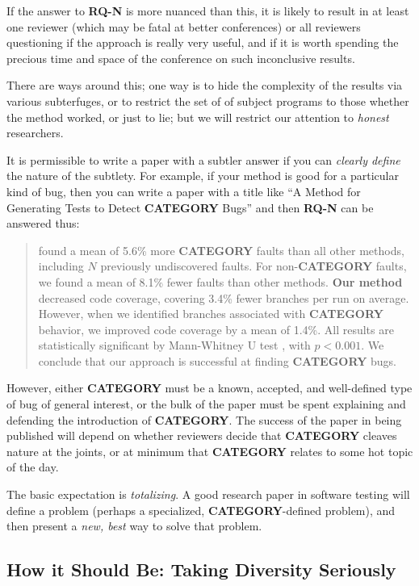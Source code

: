 \documentclass[sigplan,screen]{acmart}
\begin{document}
If the answer to {\bf RQ-N} is more nuanced than this, it is likely to result in
at least one reviewer (which may be fatal at better conferences) or
all reviewers questioning if the approach is really very useful, and
if it is worth spending the precious time and space of the conference
on such inconclusive results.

There are ways around this; one way is to hide the complexity of the
results via various subterfuges, or to restrict the set of of subject
programs to those whether the method worked, or just to lie; but we
will restrict our attention to \emph{honest} researchers.

It is permissible to write a paper with a subtler answer if you can
\emph{clearly define} the nature of the subtlety.  For example, if
your method is good for a particular kind of bug, then you can write a
paper with a title like ``A Method for Generating Tests to Detect {\bf
  CATEGORY} Bugs'' and then {\bf RQ-N} can be answered thus:


\begin{quote}
 found a mean of 5.6\% more {\bf CATEGORY} faults than all
other methods, including $N$ previously undiscovered faults.  For
non-{\bf CATEGORY} faults, we found a mean of 8.1\% fewer faults than
other methods. {\bf Our
  method} decreased code coverage, covering 3.4\% fewer branches
per run on average.  However, when we identified branches associated
with {\bf CATEGORY} behavior, we improved code coverage by a mean of
1.4\%.  All results are statistically significant by
Mann-Whitney U test \cite{arcuri2014hitchhiker}, with $p < 0.001$.  We
conclude that our approach is successful at finding {\bf CATEGORY} bugs.
\end{quote}

However, either {\bf CATEGORY} must be a known, accepted, and
well-defined type of bug of general interest, or the bulk of the paper
must be spent explaining and defending the introduction of {\bf
  CATEGORY}.  The success of the paper in being published will depend
on whether reviewers decide that {\bf CATEGORY} cleaves nature at the
joints, or at minimum that {\bf CATEGORY} relates to some hot topic of
the day.

The basic expectation is \emph{totalizing}.  A good research paper in
software testing will define a problem (perhaps a specialized, {\bf
  CATEGORY}-defined problem), and then present a \emph{new, best} way
to solve that problem.

\subsection{How it Should Be: Taking Diversity Seriously}
\end{document}
